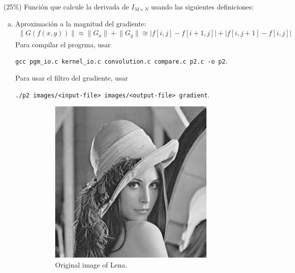 \documentclass{article}
\theoremstyle{problemstyle}
\begin{document}
\begin{problem}
(25\%) Funci\'on que calcule la derivada de $ I_{M\times N} $ usando las siguientes definiciones:
\begin{enumerate}[a)]
	\item Aproximaci\'on a la magnitud del gradiente:
	      \begin{align*}
		      \lVert G(f(x,y))\rVert \approx \lVert G_x\rVert + \lVert G_y\rVert \cong \lvert f[i,j] - f[i+1,j] \rvert + \lvert f[i, j+1] - f[i,j]\rvert
	      \end{align*}
        Para compilar el progrma, usar 

\texttt{gcc pgm\_io.c kernel\_io.c convolution.c compare.c p2.c -o p2}.

Para usar el filtro del gradiente, usar


\texttt{./p2 images/<input-file> images/<output-file> gradient}.
	      \begin{figure}[H]
		      \begin{subfigure}{.45\textwidth}
			      \centering
			      \includegraphics[width=0.95\textwidth]{lena_ascii.png}
			      \caption{Original image of Lena.}
		      \end{subfigure}
		      \hfill
		      \begin{subfigure}{.45\textwidth}
			      \centering

\end{subfigure}
\end{figure}
\end{enumerate}
\end{problem}
\end{document}

